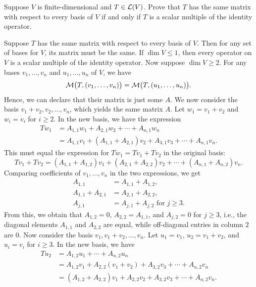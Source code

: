 \begin{exc}
\begin{exercise}
Suppose $V$ is finite-dimensional and $T\in\mathcal{L}(V)$. Prove that $T$ has the
same matrix with respect to every basis of $V$ if and only if $T$ is a scalar
multiple of the identity operator.
\end{exercise}
\begin{solution}

Suppose $T$ has the same matrix with respect to every basis of $V$. Then for any
set of bases for $V$, its matrix must be the same. If $\dim V\le1$, then every
operator on $V$ is a scalar multiple of the identity operator. Now suppose
$\dim V\ge2$. For any bases $v_1,\dots,v_n$ and $u_1,\dots,u_n$ of $V$, we have
\[ \mathcal{M}\bigl(T,(v_1,\dots,v_n)\bigr) = \mathcal{M}\bigl(T,(u_1,\dots,u_n)\bigr). \]
Hence, we can declare that their matrix is just some $A$. We now consider the
basis $v_1+v_2,v_2,\dots,v_n$, which yields the same matrix $A$. Let
$w_1=v_1+v_2$ and $w_i=v_i$ for $i\ge2$. In the new basis, we have the
expression
\begin{align*}
Tw_1 &= A_{1,1}w_1+A_{2,1}w_2+\cdots+A_{n,1}w_n\\
     &= A_{1,1}v_1+(A_{1,1}+A_{2,1})v_2+A_{3,1}v_3+\cdots+A_{n,1}v_n.
\end{align*}
This must equal the expression for $Tw_1=Tv_1+Tv_2$ in the original basis:
\[ Tv_1+Tv_2 = (A_{1,1}+A_{1,2})v_1+(A_{2,1}+A_{2,2})v_2+\cdots
   +(A_{n,1}+A_{n,2})v_n. \]
Comparing coefficients of $v_1,\dots,v_n$ in the two expressions, we get
\begin{align*}
A_{1,1} &= A_{1,1}+A_{1,2},\\
A_{1,1}+A_{2,1} &= A_{2,1}+A_{2,2},\\
A_{j,1} &= A_{j,1}+A_{j,2} \text{ for } j\ge3.
\end{align*}
From this, we obtain that $A_{1,2}=0$, $A_{2,2}=A_{1,1}$, and $A_{j,2}=0$ for
$j\ge3$, i.e., the diagonal elements $A_{1,1}$ and $A_{2,2}$ are equal, while
off-diagonal entries in column $2$ are $0$. Now consider the basis
$v_1,v_1+v_2,\dots,v_n$. Let $u_1=v_1$, $u_2=v_1+v_2$, and $u_i=v_i$ for
$i\ge3$. In the new basis, we have
\begin{align*}
Tu_2 &= A_{1,2}u_1+\cdots+A_{n,2}u_n\\
     &= A_{1,2}v_1+A_{2,2}(v_1+v_2)+A_{3,2}v_3+\cdots+A_{n,2}v_n\\
     &= (A_{1,2}+A_{2,2})v_1+A_{2,2}v_2+A_{3,2}v_3+\cdots+A_{n,2}v_n.\\

\end{align*}
\end{solution}
\end{exc}
